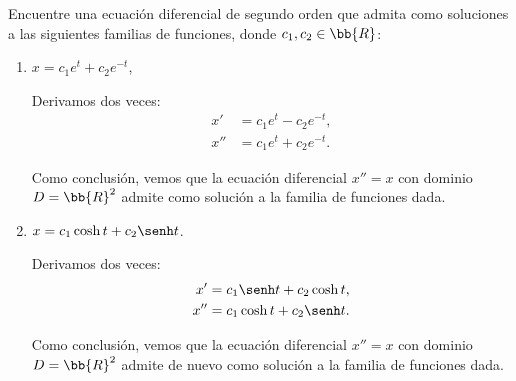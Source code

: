 \begin{ejercicio}
    Encuentre una ecuación diferencial de segundo orden que admita como soluciones a las siguientes familias de funciones, donde \(c_1, c_2 \in \bb{R}\):
    \begin{enumerate}
        \item \(x = c_1e^t + c_2e^{-t}\),
        
        Derivamos dos veces:
        \begin{align*}
            x' &= c_1e^t - c_2e^{-t},\\
            x'' &= c_1e^t + c_2e^{-t}.
        \end{align*}

        Como conclusión, vemos que la ecuación diferencial $x''=x$ con dominio $D=\bb{R}^2$ admite como solución a la familia de funciones dada.
        \item \(x = c_1\cosh t + c_2\senh t\).
        
        Derivamos dos veces:
        \begin{align*}
            x' &= c_1\senh t + c_2\cosh t,\\
            x'' &= c_1\cosh t + c_2\senh t.
        \end{align*}

        Como conclusión, vemos que la ecuación diferencial $x''=x$ con dominio $D=\bb{R}^2$ admite de nuevo como solución a la familia de funciones dada.
    \end{enumerate}
\end{ejercicio}


